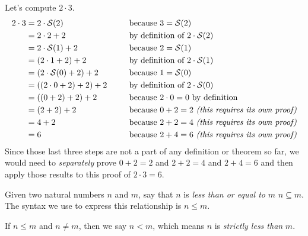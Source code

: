\begin{example}
    Let's compute \(2 \cdot 3\).
    \begin{alignat*}{2}
        2 \cdot 3 &= 2 \cdot \successor{2} &&\text{ because } 3 = \successor{2}\\
              &= 2 \cdot 2 + 2 &&\text{ by definition of } 2 \cdot \successor{2}\\
              &= 2 \cdot \successor{1} + 2 &&\text{ because } 2 = \successor{1}\\
              &= \pn*{2 \cdot 1 + 2} + 2 &&\text{ by definition of } 2 \cdot \successor{1}\\
              &= \pn*{2 \cdot \successor{0} + 2} + 2 &&\text{ because } 1 = \successor{0}\\
              &= \pn*{\pn*{2 \cdot 0 + 2} + 2} + 2~~~~&&\text{ by definition of } 2 \cdot \successor{0}\\
              &= \pn*{\pn*{0 + 2} + 2} + 2 &&\text{ because } 2 \cdot 0 = 0 \text{ by definition}\\
              &= \pn*{2 + 2} + 2 &&\text{ because } 0 + 2 = 2 \text{ \emph{(this requires its own proof)}}\\
              &= 4 + 2 &&\text{ because } 2 + 2 = 4 \text{ \emph{(this requires its own proof)}}\\
              &= 6 &&\text{ because } 2 + 4 = 6 \text{ \emph{(this requires its own proof)}}
    \end{alignat*}
    Since those last three steps are not a part of any definition or theorem so far,
    we would need to \emph{separately} prove \(0 + 2 = 2\) and \(2 + 2 = 4\) and \(2 + 4 = 6\)
    and then apply those results to this proof of \(2 \cdot 3 = 6\).
\end{example}

\begin{definition}
    Given two natural numbers \(n\) and \(m\),
    say that \(n\) is \emph{less than or equal to} \(m\) \iffbydefn \(n \subseteq m\).
    The syntax we use to express this relationship is \(n \leq m\).

    If \(n \leq m\) and \(n \neq m\), then we say \(n < m\),
    which means \(n\) is \emph{strictly less than} \(m\).
\end{definition}

